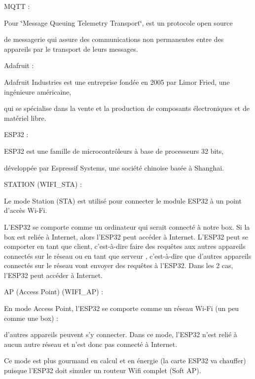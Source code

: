 MQTT \+:
\begin{DoxyItemize}
\item Pour \char`\"{}\+Message Queuing Telemetry Transport\char`\"{}, est un protocole open source
\item de messagerie qui assure des communications non permanentes entre des appareils par le transport de leurs messages.
\end{DoxyItemize}

Adafruit \+:
\begin{DoxyItemize}
\item Adafruit Industries est une entreprise fondée en 2005 par Limor Fried, une ingénieure américaine,
\item qui se spécialise dans la vente et la production de composants électroniques et de matériel libre. ~\newline

\end{DoxyItemize}

ESP32 \+:
\begin{DoxyItemize}
\item ESP32 est une famille de microcontrôleurs à base de processeurs 32 bits,
\item développée par Espressif Systems, une société chinoise basée à Shanghai.
\end{DoxyItemize}

STATION (WIFI\+\_\+\+STA) \+:
\begin{DoxyItemize}
\item Le mode Station (STA) est utilisé pour connecter le module ESP32 à un point d’accès Wi-\/\+Fi.
\item L’\+ESP32 se comporte comme un ordinateur qui serait connecté à notre box. Si la box est reliée à Internet, alors l’\+ESP32 peut accéder à Internet. L’\+ESP32 peut se comporter en tant que client, c’est-\/à-\/dire faire des requêtes aux autres appareils connectés sur le réseau ou en tant que serveur , c’est-\/à-\/dire que d’autres appareils connectés sur le réseau vont envoyer des requêtes à l’\+ESP32. Dans les 2 cas, l’\+ESP32 peut accéder à Internet.
\end{DoxyItemize}

AP (Access Point) (WIFI\+\_\+\+AP) \+:
\begin{DoxyItemize}
\item En mode Access Point, l’\+ESP32 se comporte comme un réseau Wi-\/\+Fi (un peu comme une box) \+:
\item d’autres appareils peuvent s’y connecter. Dans ce mode, l’\+ESP32 n’est relié à aucun autre réseau et n’est donc pas connecté à Internet.
\item Ce mode est plus gourmand en calcul et en énergie (la carte ESP32 va chauffer) puisque l’\+ESP32 doit simuler un routeur Wifi complet (Soft AP).
\end{DoxyItemize}

